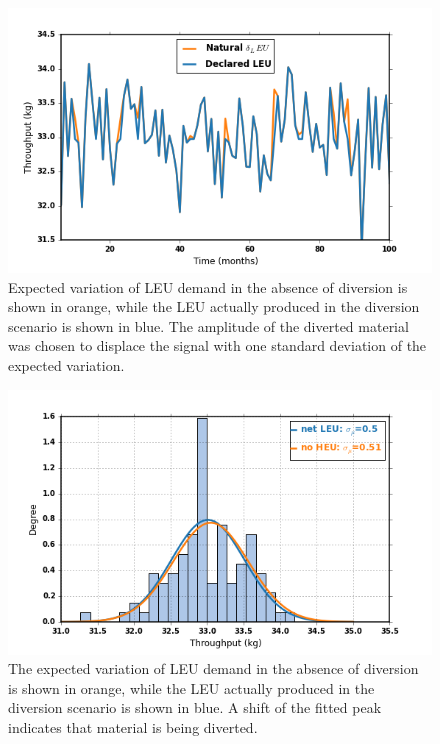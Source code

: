\begin{figure}
\begin{center}
\includegraphics[natwidth=162bp,natheight=227bp, scale=0.7]{./figs/nat_delta_R5.png}
\end{center}
\caption{Expected variation of \gls{LEU} demand in the absence of diversion is shown in orange, while the \gls{LEU} actually produced in the diversion scenario is shown in blue. The amplitude of the diverted material was chosen to displace the signal with one standard deviation of the expected variation. }
\label{fig:leu_produced}
\end{figure}


\begin{figure}
\begin{center}
\includegraphics[natwidth=162bp,natheight=227bp, scale=0.7]{./figs/netLEU_hist_R5_new.png}
\end{center}
\caption{The expected variation of \gls{LEU} demand in the absence of diversion is shown in orange, while the \gls{LEU} actually produced in the diversion scenario is shown in blue.  A shift of the fitted peak indicates that material is being diverted.}
\label{fig:leu_histogram}
\end{figure}

